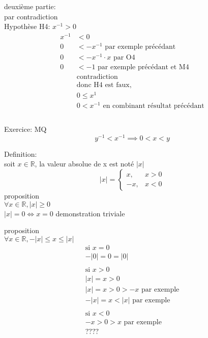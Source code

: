 \documentclass{article}
\newcommand{\reals}{\mathbb{R}}
\begin{document}
deuxième partie:\\
par contradiction\\
Hypothèse H4: $x^{-1} > 0$
\begin{equation}
\begin{aligned}
    x^{-1} &< 0\\
    0 &< - x^{-1} \text{ par exemple précédant} \\
    0 &< - x^{-1} \cdot x \text{ par O4} \\
    0 &< - 1 \text{ par exemple précédant et M4} \\
    &\text{contradiction} \\
    &\text{donc H4 est faux}, \\
    &0 \le x^{1}\\
    &0 < x^{-1} \text{ en combinant résultat précédant}\\
\end{aligned}
\end{equation}\\

Exercice: MQ \\
$$y^{-1} < x^{-1} \implies 0 < x < y$$

Definition:\\
soit $x \in \reals$, la valeur absolue de x est noté $|x|$\\

$$
|x| = 
\begin{cases}
    x ,& x > 0 \\
    -x ,& x < 0
\end{cases}
$$
proposition\\
$\forall x \in \reals, |x| \ge 0$ \\
$ |x| = 0 \Longleftrightarrow x = 0$
demonstration triviale

proposition\\
$\forall x \in \reals, -|x| \le x \le |x|$ \\
\begin{equation}
\begin{aligned}
    \text{si } x = 0\\
    - |0| = 0 = |0| \\
    \\
    \text{si } x > 0\\
    |x| = x > 0 \\
    |x| = x > 0 > -x \text{ par exemple}\\
    - |x| = x < |x| \text{ par exemple}\\
    \\
    \text{si } x < 0\\
    -x > 0 > x \text{ par exemple}\\
    ????\\\
\end{aligned}
\end{equation}\\
\end{document}
